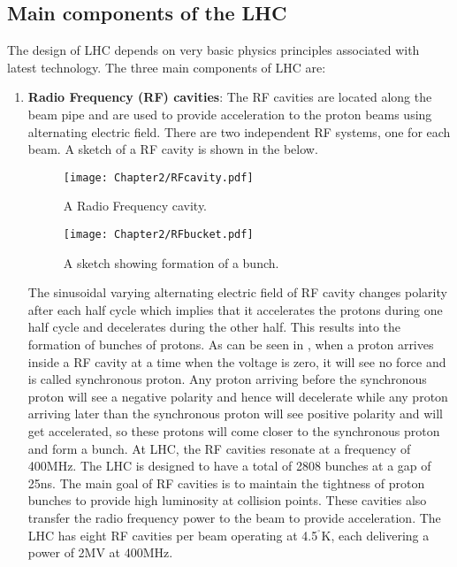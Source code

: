 \subsection{Main components of the LHC}
The design of LHC depends on very basic physics principles associated with latest technology. 
The three main components of LHC are:
\vspace{-0.1in}
\begin{enumerate}[leftmargin=*]
\item {\bf{Radio Frequency (RF) cavities}}: The RF cavities are located along the beam pipe and are used to provide acceleration to the 
  proton beams using alternating electric field. There are two independent RF systems, one for each beam. A sketch of a RF cavity is shown in the \fig{\ref{fig:RFcavity}}
  below.
  
  \begin{minipage}{0.55\textwidth}
  \begin{figure}[H]
    \texttt{[image: Chapter2/RFcavity.pdf]}
    \caption{\label{fig:RFcavity} A Radio Frequency cavity.}
  \end{figure}
  \end{minipage}%
  \hfill
  \begin{minipage}{0.35\textwidth}
  \begin{figure}[H]
    \texttt{[image: Chapter2/RFbucket.pdf]}
    \caption{\label{fig:RFbucket} A sketch showing formation of a bunch.}
  \end{figure}
  \end{minipage}
  \vspace{0.1in}
  
  The sinusoidal varying alternating electric field of RF cavity changes polarity after each half cycle which implies that it accelerates the protons during one
  half cycle and decelerates during the other half. This results into the formation of bunches of protons. As can be seen in \fig{\ref{fig:RFbucket}}, when a proton
  arrives inside a RF cavity at a time when the voltage is zero, it will see no force and is called synchronous proton.
  Any proton arriving before the synchronous proton will see a negative polarity and hence will decelerate while any proton arriving later than
  the synchronous proton will see positive polarity and will get accelerated, so these protons will come closer to the synchronous proton and form a bunch.
  At LHC, the RF cavities resonate at a frequency of 400\unit{MHz}. The LHC is designed to have a total of 2808 bunches at a gap of 25\unit{ns}.
  The main goal of RF cavities is to maintain the tightness of proton bunches to provide high luminosity at collision points. These cavities also transfer
  the radio frequency power to the beam to provide acceleration. The LHC has eight RF cavities per beam operating at 4.5$^{^{\circ}}$\unit{K},
  each delivering a power of 2\unit{MV} at 400\unit{MHz}. 
    

\end{enumerate}
